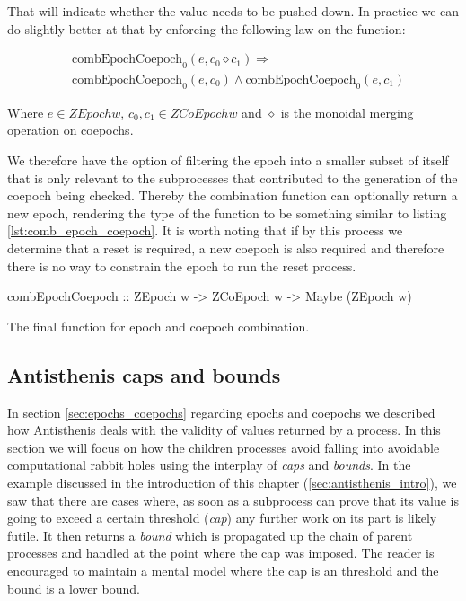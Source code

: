 That will indicate whether the value needs to be pushed down. In
practice we can do slightly better at that by enforcing the following
law on the  function:

\begin{align*}
& \text{combEpochCoepoch}_0(e, c_0 \diamond c_1) \Rightarrow \\
& \text{combEpochCoepoch}_0(e,c_0) \land \text{combEpochCoepoch}_0(e,c_1)
\end{align*}

Where \(e \in \mathit{ZEpoch w}\), \(c_0,c_1 \in \mathit{ZCoEpoch w}\)
and \(\diamond\) is the monoidal merging operation on coepochs.

We therefore have the option of filtering the epoch into a smaller
subset of itself that is only relevant to the subprocesses that
contributed to the generation of the coepoch being checked. Thereby
the combination function can optionally return a new epoch, rendering
the type of the function to be something similar to listing
\ref{lst:comb_epoch_coepoch}. It is worth noting that if by this
process we determine that a reset is required, a new coepoch is also
required and therefore there is no way to constrain the epoch to run
the reset process.

\begin{code}
\begin{haskellcode}
combEpochCoepoch :: ZEpoch w -> ZCoEpoch w -> Maybe (ZEpoch w)
\end{haskellcode}
  \caption{\label{lst:comb_epoch_coepoch}The final function for epoch
    and coepoch combination.}
\end{code}

\subsection{Antisthenis caps and bounds}
\label{sec:caps_and_bounds}

In section \ref{sec:epochs_coepochs} regarding epochs and coepochs we
described how Antisthenis deals with the validity of values returned
by a process.  In this section we will focus on how the children
processes avoid falling into avoidable computational rabbit holes
using the interplay of \emph{caps} and \emph{bounds}.  In the example
discussed in the introduction of this chapter
(\ref{sec:antisthenis_intro}), we saw that there are cases where, as
soon as a subprocess can prove that its value is going to exceed a
certain threshold (\emph{cap}) any further work on its part is likely
futile. It then returns a \emph{bound} which is propagated up the
chain of parent processes and handled at the point where the cap was
imposed.  The reader is encouraged to maintain a mental model where
the cap is an threshold and the bound is a lower bound.

